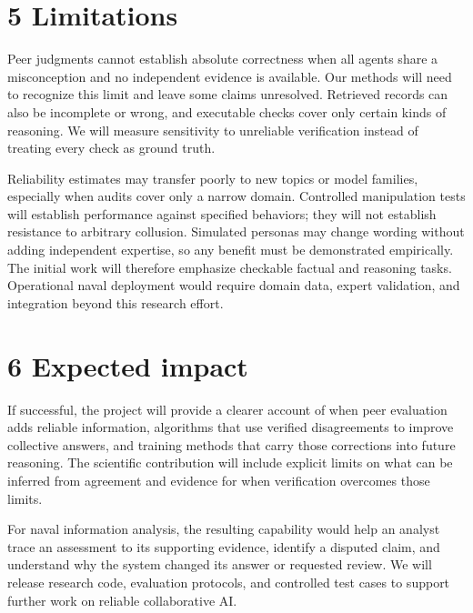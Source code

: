 \documentclass[12pt,letterpaper]{article}
\begin{document}
\section*{5 Limitations}
Peer judgments cannot establish absolute correctness when all agents share a misconception and no independent evidence is available. Our methods will need to recognize this limit and leave some claims unresolved. Retrieved records can also be incomplete or wrong, and executable checks cover only certain kinds of reasoning. We will measure sensitivity to unreliable verification instead of treating every check as ground truth.

Reliability estimates may transfer poorly to new topics or model families, especially when audits cover only a narrow domain. Controlled manipulation tests will establish performance against specified behaviors; they will not establish resistance to arbitrary collusion. Simulated personas may change wording without adding independent expertise, so any benefit must be demonstrated empirically. The initial work will therefore emphasize checkable factual and reasoning tasks. Operational naval deployment would require domain data, expert validation, and integration beyond this research effort.


\section*{6 Expected impact}
If successful, the project will provide a clearer account of when peer evaluation adds reliable information, algorithms that use verified disagreements to improve collective answers, and training methods that carry those corrections into future reasoning. The scientific contribution will include explicit limits on what can be inferred from agreement and evidence for when verification overcomes those limits.

For naval information analysis, the resulting capability would help an analyst trace an assessment to its supporting evidence, identify a disputed claim, and understand why the system changed its answer or requested review. We will release research code, evaluation protocols, and controlled test cases to support further work on reliable collaborative AI.
\end{document}
